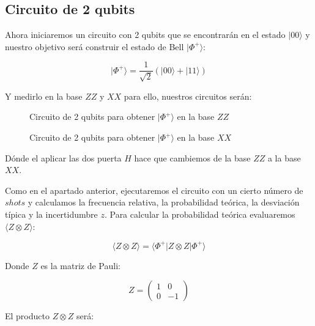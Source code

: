\documentclass[11pt, a4paper, twocolumn]{article}
\begin{document}
\subsection{Circuito de 2 qubits}

Ahora iniciaremos un circuito con 2 qubits que se encontrarán en el estado
$|00\rangle$ y nuestro objetivo será 
construir el estado de Bell $|\Phi^+\rangle$:

\begin{equation}
	|\Phi^+\rangle = \frac{1}{\sqrt{2}}\left( |00\rangle + |11\rangle\right)
\end{equation}

Y medirlo en la base $ZZ$ y $XX$ para ello, nuestros circuitos serán:

\begin{figure}[h]
	\centering
	
	\caption{Circuito de 2 qubits para obtener $|\Phi^+\rangle$ en la base $ZZ$}
	\label{circ2qb}
\end{figure}

\begin{figure}[h]
	\centering
	
	\caption{Circuito de 2 qubits para obtener $|\Phi^+\rangle$ en la base $XX$}
	\label{circ2qbXX}
\end{figure}
\newpage

Dónde el aplicar las dos puerta $H$ hace que cambiemos de la base $ZZ$ a la base
$XX$.

\vspace{0.2cm}
Como en el apartado anterior, ejecutaremos el circuito con un cierto número 
de $shots$ y calculamos la frecuencia relativa, la probabilidad teórica, 
la desviación típica y la incertidumbre $z$. Para calcular la probabilidad 
teórica evaluaremos $\langle Z \otimes Z \rangle$:

\begin{equation}
	\langle Z \otimes Z \rangle = \langle \Phi^+| Z \otimes Z |\Phi^+ \rangle 
\end{equation}

Donde $Z$ es la matriz de Pauli:

\begin{equation}
	Z = 
	\begin{pmatrix}
		1 & 0\\ 0 & -1
	\end{pmatrix}
\end{equation}

El producto $Z \otimes Z$ será:
\end{document}
